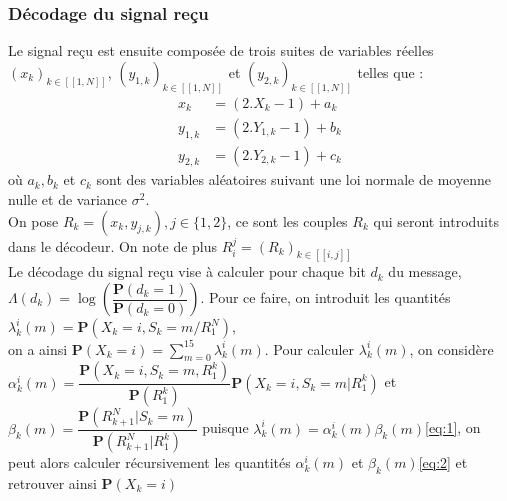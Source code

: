 \documentclass[12pt]{article}
\begin{document}
\subsubsection{D\'ecodage du signal re\c{c}u}
Le signal re\c{c}u est ensuite compos\'ee de trois suites de variables r\'eelles $(x_k)_{k \in [\![1, N]\!]}$, $(y_{1,k})_{k \in [\![1, N]\!]}$ et $(y_{2,k})_{k \in [\![1, N]\!]}$ telles que :
\begin{align*} \label{dec_input}
	x_k & = (2.X_k - 1) + a_k \\
	y_{1,k} & = (2.Y_{1,k} - 1) + b_k \\
	y_{2,k} & = (2.Y_{2,k} - 1) + c_k
\end{align*}
o\`u $a_k, b_k$ et $c_k$ sont des variables al\'eatoires suivant une loi normale de moyenne nulle et de variance $\sigma^2$.\\
On pose $R_k = (x_k,y_{j,k}), j \in \{1, 2\}$, ce sont les couples $R_k$ qui seront introduits dans le d\'ecodeur. On note de plus $R_i^j = (R_k)_{k \in [\![i, j]\!]}$\\
Le d\'ecodage du signal re\c{c}u vise \`a calculer pour chaque bit $d_k$ du message, $\Lambda(d_k) = \log\left(\dfrac{\mathbf{P}(d_k = 1)}{\mathbf{P}(d_k = 0)}\right)$. Pour ce faire, on introduit les quantit\'es $\lambda_k^i(m) = \mathbf{P}(X_k = i, S_k = m / R_1^N)$,\\
on a ainsi $\mathbf{P}(X_k = i) = \sum\limits_{m=0}^{15} \lambda_k^i(m)$. Pour calculer $\lambda_k^i(m)$, on consid\`ere \\
$\alpha_k^i(m)=\dfrac{\mathbf{P}(X_k=i,S_k=m,R_1^k)}{\mathbf{P}(R_1^k)}\mathbf{P}(X_k=i,S_k=m|R_1^k)$ et $\beta_k(m)=\dfrac{\mathbf{P}(R_{k+1}^N|S_k=m)}{\mathbf{P}(R_{k+1}^N|R_1^k)}$ puisque $\lambda_k^i(m)=\alpha_k^i(m)\beta_k(m)$\ref{eq:1}, on peut alors calculer r\'ecursivement les quantit\'es $\alpha_k^i(m)$ et $\beta_k(m)$\ref{eq:2} et retrouver ainsi $\mathbf{P}(X_k = i)$
\end{document}
